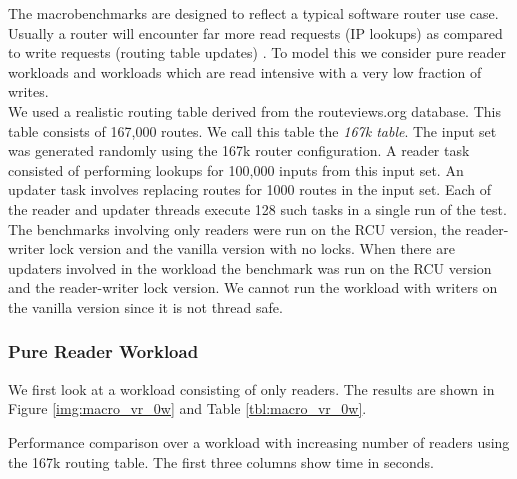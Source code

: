 \documentclass[a4paper,marginparwidth=50pt,marginparsep=10pt]{article}
\begin{document}
The macrobenchmarks are designed to reflect a typical software router
use case. Usually a router will encounter far more read requests (IP
lookups) as compared to write requests (routing table updates) . To
model this we consider pure reader workloads and workloads which are
read intensive with a very low fraction of writes.\\

We used a realistic routing table derived from the routeviews.org
database\cite{routeviews}. This table consists of 167,000 routes. We call this table
the \emph{167k table}. The input set was generated randomly using the
167k router configuration. A reader task consisted of performing
lookups for 100,000 inputs from this input set. An updater task
involves replacing routes for 1000 routes in the input set. Each of
the reader and updater threads execute 128 such tasks in a single run
of the test.\\

The benchmarks involving only readers were run on the RCU version,
the reader-writer lock version and the vanilla version with no
locks. When there are updaters involved in the workload the benchmark
was run on the RCU version and the reader-writer lock version. We
cannot run the workload with writers on the vanilla version since it
is not thread safe.

\subsubsection{Pure Reader Workload}
 We first look at a workload consisting of only readers. The results
 are shown in Figure \ref{img:macro_vr_0w} and Table
 \ref{tbl:macro_vr_0w}.

\begin{table}[tph]
\begin{center}

\end{center}
\caption{Performance comparison over a workload with increasing number of readers using the 167k routing table. The first three columns show time in seconds.}
\label{tbl:macro_vr_0w}
\end{table}
\end{document}
